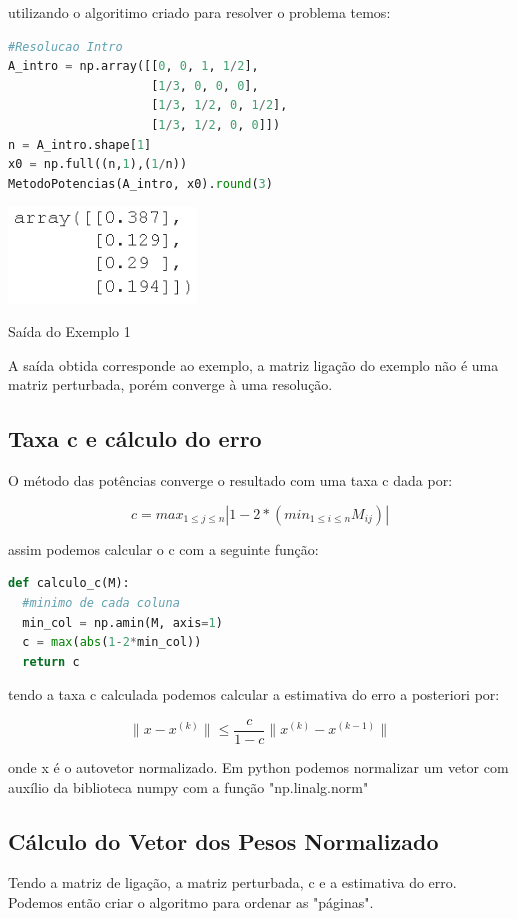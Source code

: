 \documentclass[a4paper, 12pt]{article}
\begin{document}
utilizando o algoritimo criado para resolver o problema temos:

\begin{lstlisting}[language=Python, caption=Resolução do Exemplo 1 pelo algoritmo]
#Resolucao Intro
A_intro = np.array([[0, 0, 1, 1/2],
                    [1/3, 0, 0, 0],
                    [1/3, 1/2, 0, 1/2],
                    [1/3, 1/2, 0, 0]])
n = A_intro.shape[1]
x0 = np.full((n,1),(1/n))
MetodoPotencias(A_intro, x0).round(3)
\end{lstlisting}

\begin{center}
    \includegraphics[width=5cm]{saida_ex1.PNG}
    
    Saída do Exemplo 1 
\end{center}

A saída obtida corresponde ao exemplo, a matriz ligação do exemplo não é uma matriz perturbada, porém converge à uma resolução.

\subsection{Taxa c e cálculo do erro}

O método das potências converge o resultado com uma taxa c dada por:

$$c = max_{1\leq j \leq n}\left|{1-2 *(min_{1\leq i \leq n} M_{ij})} \right|$$

assim podemos calcular o c com a seguinte função:

\begin{lstlisting}[language=Python, caption=Cálculo da taxa c]
def calculo_c(M):
  #minimo de cada coluna
  min_col = np.amin(M, axis=1)
  c = max(abs(1-2*min_col))
  return c
\end{lstlisting}

tendo a taxa c calculada podemos calcular a estimativa do erro a posteriori por:

$$\|x - x^{(k)}\|\leq \frac{c}{1-c}\|x^{(k)}-x^{(k-1)}\|$$

onde x é o autovetor normalizado.
Em python podemos normalizar um vetor com auxílio da biblioteca numpy com a função "np.linalg.norm"

\subsection{Cálculo do Vetor dos Pesos Normalizado}
Tendo a matriz de ligação, a matriz perturbada, c e a estimativa do erro. Podemos então criar o algoritmo para ordenar as "páginas".
\end{document}
